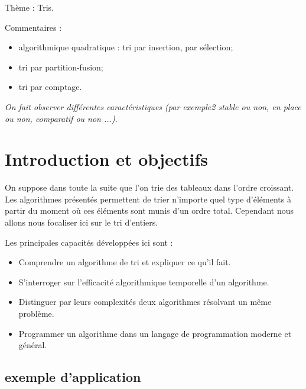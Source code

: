 



Thème : Tris.
 
Commentaires :
\begin{itemize}
\item algorithmique quadratique : tri par insertion, par sélection;
\item tri par partition-fusion;
\item tri par comptage.
\end{itemize}
\textit{On fait observer différentes caractéristiques (par exemple2 stable ou non, en place ou non, comparatif ou non ...).}




\section{Introduction et objectifs}

\begin{obj}
On suppose dans toute la suite que l'on trie des tableaux dans l'ordre croissant. Les algorithmes présentés permettent de trier n'importe quel type d'éléments à partir du moment où ces éléments sont munis d'un ordre total. Cependant nous allons nous focaliser ici sur le tri d'entiers.

Les principales capacités développées ici sont :
\begin{itemize}
\item Comprendre un algorithme de tri et expliquer ce qu'il fait.
\item S'interroger sur l'efficacité algorithmique temporelle d'un algorithme.
\item Distinguer par leurs complexités deux algorithmes résolvant un même problème.
\item Programmer un algorithme dans un langage de programmation moderne et général.
\end{itemize}

\end{obj}
\subsection{exemple d'application}

